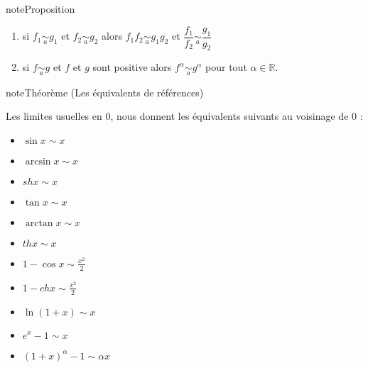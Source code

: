 \documentclass[letterpaper,10pt,french]{jupyterBook}
\begin{document}
\begin{sphinxadmonition}{note}{Proposition}
\begin{itemize}
\begin{enumerate}
\item {} 
\sphinxAtStartPar
si \(f_1 \underset{a}{\sim} g_1\) et \(f_2 \underset{a}{\sim} g_2\) alors \(f_1f_2 \underset{a}{\sim} g_1g_2\) et \(\dfrac{f_1}{f_2} \underset{a}{\sim} \dfrac{g_1}{g_2}\)

\item {} 
\sphinxAtStartPar
si \(f \underset{a}{\sim} g\) et \(f\) et \(g\) sont positive alors \(f^\alpha \underset{a}{\sim} g^\alpha\) pour tout \(\alpha \in \mathbb{R}\).

\end{enumerate}

\end{itemize}
\end{sphinxadmonition}

\begin{sphinxadmonition}{note}{Théorème (Les équivalents de références)}

\sphinxAtStartPar
Les limites usuelles en 0, nous donnent les équivalents suivants au voisinage de \(0\) :
\begin{itemize}
\item {} 
\sphinxAtStartPar
\(\sin x \sim x\)

\item {} 
\sphinxAtStartPar
\(\arcsin x \sim x\)

\item {} 
\sphinxAtStartPar
\(sh x \sim x\)

\item {} 
\sphinxAtStartPar
\(\tan x \sim x\)

\item {} 
\sphinxAtStartPar
\(\arctan x \sim x\)

\item {} 
\sphinxAtStartPar
\(th x \sim x\)

\item {} 
\sphinxAtStartPar
\(1 − \cos x \sim \frac{x^2}{2}\)

\item {} 
\sphinxAtStartPar
\(1 − ch x \sim \frac{x^2}{2}\)

\item {} 
\sphinxAtStartPar
\(\ln(1 + x) \sim x\)

\item {} 
\sphinxAtStartPar
\(e^x − 1 \sim x\)

\item {} 
\sphinxAtStartPar
\((1 + x)^α − 1 \sim αx\)

\end{itemize}


\end{sphinxadmonition}
\end{document}
